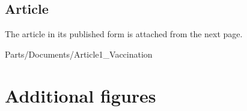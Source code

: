 \subsection{Article}
\label{Vaccine:ArticlePDF}
The article in its published form is attached from the next page.


		{Parts/Documents/Article1_Vaccination}



\section{Additional figures}
\label{Vaccine:Appendix}

